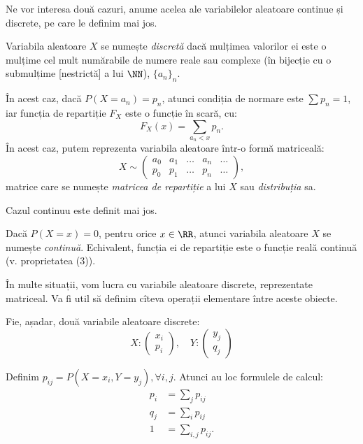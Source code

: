 Ne vor interesa două cazuri, anume acelea ale variabilelor aleatoare continue și discrete,
pe care le definim mai jos.

\begin{definition}\label{def:v-disc}
  Variabila aleatoare $ X $ se numește \emph{discretă} dacă mulțimea valorilor
  ei este o mulțime cel mult numărabile de numere reale sau complexe (în bijecție
  cu o submulțime [nestrictă] a lui $ \NN $), $ \{a_n\}_n $.
\end{definition}

În acest caz, dacă $ P(X = a_n) = p_n $, atunci condiția de normare este $ \sum p_n = 1 $,
iar funcția de repartiție $ F_X $ este o funcție în scară, cu:
\[
  F_X(x) = \sum_{a_n < x} p_n.
\]
În acest caz, putem reprezenta variabila aleatoare într-o formă matriceală:
\[
  X \sim %
  \begin{pmatrix}
    a_0 & a_1 & \dots & a_n & \dots \\
    p_0 & p_1 & \dots & p_n & \dots
  \end{pmatrix},
\]
matrice care se numește \emph{matricea de repartiție} a lui $ X $ sau \emph{distribuția} sa.

Cazul continuu este definit mai jos.

\begin{definition}\label{def:v-cont}
  Dacă $ P(X = x) = 0 $, pentru orice $ x \in \RR $, atunci variabila aleatoare $ X $ se numește
  \emph{continuă}. Echivalent, funcția ei de repartiție este o funcție reală continuă
  (v. proprietatea (3)).
\end{definition}

În multe situații, vom lucra cu variabile aleatoare discrete, reprezentate matriceal. Va fi
util să definim cîteva operații elementare între aceste obiecte.

Fie, așadar, două variabile aleatoare discrete:
\[
  X : \begin{pmatrix} x_i \\ p_i \end{pmatrix}, \quad %
  Y : \begin{pmatrix} y_j \\ q_j \end{pmatrix}
\]

Definim $ p_{ij} = P(X = x_i, Y = y_j), \forall i,j $. Atunci au loc formulele de calcul:
\begin{align*}
  p_i &= \sum_j p_{ij} \\
  q_j &= \sum_i p_{ij} \\
  1 &= \sum_{i,j} p_{ij}.
\end{align*}

